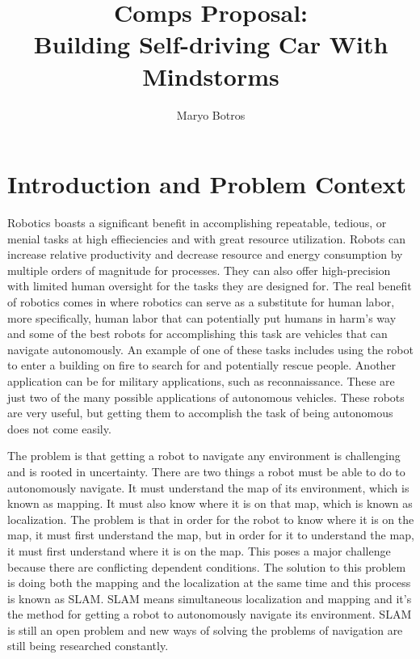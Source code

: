\documentclass[10pt,twocolumn]{article}
\title{Comps Proposal: \\ Building Self-driving Car With Mindstorms}
\author{Maryo Botros}
\affiliation{Occidental College}
\begin{document}
\maketitle


\section{Introduction and Problem Context}

Robotics boasts a significant benefit in accomplishing repeatable, tedious, or menial tasks at high effieciencies and with great resource utilization. Robots can increase relative productivity and decrease resource and energy consumption by multiple orders of magnitude for processes. They can also offer high-precision with limited human oversight for the tasks they are designed for. The real benefit of robotics comes in where robotics can serve as a substitute for human labor, more specifically, human labor that can potentially put humans in harm's way and some of the best robots for accomplishing this task are vehicles that can navigate autonomously. An example of one of these tasks includes using the robot to enter a building on fire to search for and potentially rescue people. Another application can be for military applications, such as reconnaissance. These are just two of the many possible applications of autonomous vehicles. These robots are very useful, but getting them to accomplish the task of being autonomous does not come easily.

The problem is that getting a robot to navigate any environment is challenging and is rooted in uncertainty. There are two things a robot must be able to do to autonomously navigate. It must understand the map of its environment, which is known as mapping. It must also know where it is on that map, which is known as localization. The problem is that in order for the robot to know where it is on the map, it must first understand the map, but in order for it to understand the map, it must first understand where it is on the map. This poses a major challenge because there are conflicting dependent conditions. The solution to this problem is doing both the mapping and the localization at the same time and this process is known as SLAM. SLAM means simultaneous localization and mapping and it's the method for getting a robot to autonomously navigate its environment. SLAM is still an open problem and new ways of solving the problems of navigation are still being researched constantly.
\end{document}
